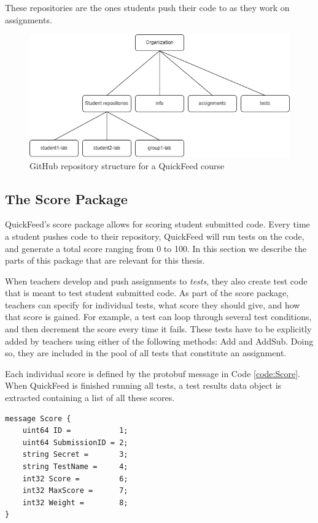 These repositories are the ones students push their code to as they work on assignments.

\begin{figure}[ht]
    \centering
    \includegraphics[width=\textwidth]{photos/qf-repository-structure.png}
    \caption{GitHub repository structure for a QuickFeed course}
    \label{fig:qf-repository-structure}
\end{figure}

\subsection{The Score Package}
\label{sec:the-score-package}

QuickFeed's score package allows for scoring student submitted code.
Every time a student pushes code to their repository, QuickFeed will run tests on the code, and generate a total score ranging from 0 to 100.
In this section we describe the parts of this package that are relevant for this thesis.

When teachers develop and push assignments to \textit{tests}, they also create test code that is meant to test student submitted code.
As part of the score package, teachers can specify for individual tests, what score they should give, and how that score is gained.
For example, a test can loop through several test conditions, and then decrement the score every time it fails.
These tests have to be explicitly added by teachers using either of the following methods: Add and AddSub.
Doing so, they are included in the pool of all tests that constitute an assignment.

Each individual score is defined by the protobuf message in Code \ref{code:Score}.
When QuickFeed is finished running all tests, a test results data object is extracted containing a list of all these scores.

\begin{lstlisting}[caption={Score message}, label={code:Score}]
message Score {
    uint64 ID =           1;
    uint64 SubmissionID = 2;
    string Secret =       3;
    string TestName =     4;
    int32 Score =         6;
    int32 MaxScore =      7;
    int32 Weight =        8;
}
\end{lstlisting}

